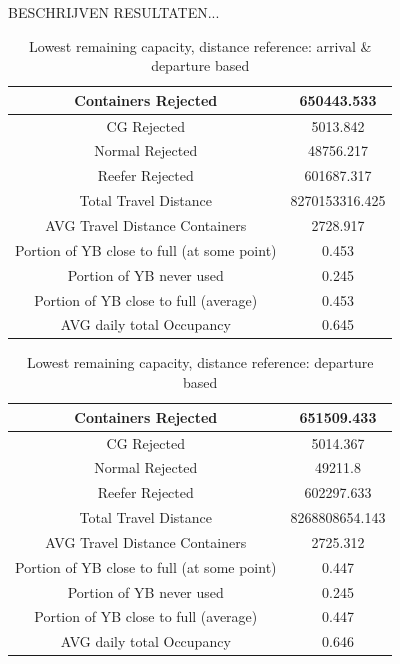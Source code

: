\documentclass{article}
\begin{document}
BESCHRIJVEN RESULTATEN...
\begin{table}[h]
    \centering
    \begin{tabular}{|c|c|}
        \hline
        Containers Rejected                         & 650443.533     \\ \hline
        CG Rejected                                 & 5013.842       \\ \hline
        Normal Rejected                             & 48756.217      \\ \hline
        Reefer Rejected                             & 601687.317     \\ \hline
        Total Travel Distance                       & 8270153316.425 \\ \hline
        AVG Travel Distance Containers              & 2728.917       \\ \hline
        Portion of YB close to full (at some point) & 0.453          \\ \hline
        Portion of YB never used                    & 0.245          \\ \hline
        Portion of YB close to full (average)       & 0.453          \\ \hline
        AVG daily total Occupancy                   & 0.645          \\ \hline
    \end{tabular}
    \caption{Lowest remaining capacity,  distance reference: arrival \& departure based}
\end{table}

\begin{table}[h]
    \centering
    \begin{tabular}{|c|c|}
        \hline
        Containers Rejected                         & 651509.433     \\ \hline
        CG Rejected                                 & 5014.367       \\ \hline
        Normal Rejected                             & 49211.8        \\ \hline
        Reefer Rejected                             & 602297.633     \\ \hline
        Total Travel Distance                       & 8268808654.143 \\ \hline
        AVG Travel Distance Containers              & 2725.312       \\ \hline
        Portion of YB close to full (at some point) & 0.447          \\ \hline
        Portion of YB never used                    & 0.245          \\ \hline
        Portion of YB close to full (average)       & 0.447          \\ \hline
        AVG daily total Occupancy                   & 0.646          \\ \hline
    \end{tabular}
    \caption{Lowest remaining capacity, distance reference: departure based}
\end{table}
\end{document}
